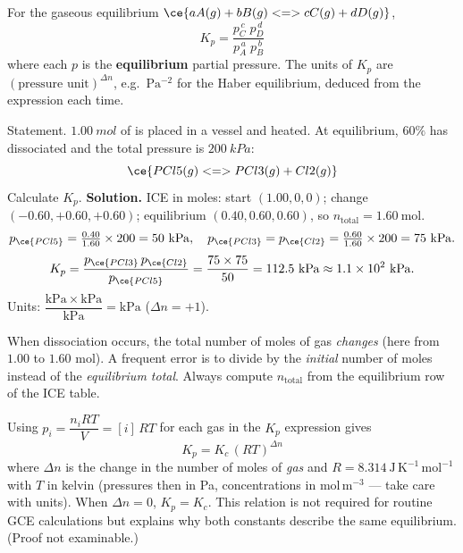 \documentclass[11pt]{article}
\begin{document}
\begin{definition}
For the gaseous equilibrium $\ce{aA(g) + bB(g) <=> cC(g) + dD(g)}$,
\[
K_p=\frac{p_C^{\,c}\; p_D^{\,d}}{p_A^{\,a}\; p_B^{\,b}}
\]
where each $p$ is the \textbf{equilibrium} partial pressure. The units of $K_p$ are $(\text{pressure unit})^{\Delta n}$, e.g.\ $\mathrm{Pa^{-2}}$ for the Haber equilibrium, deduced from the expression each time.
\end{definition}

\begin{exoresolu}
Statement. $\SI{1.00}{mol}$ of  is placed in a vessel and heated. At equilibrium, $60\%$ has dissociated and the total pressure is $\SI{200}{kPa}$:
\[
\ce{PCl5(g) <=> PCl3(g) + Cl2(g)}
\]
Calculate $K_p$.
\tcblower
\textbf{Solution.} ICE in moles: start $(1.00, 0, 0)$; change $(-0.60, +0.60, +0.60)$; equilibrium $(0.40, 0.60, 0.60)$, so $n_{\text{total}}=1.60\ \mathrm{mol}$.
\[
p_{\ce{PCl5}}=\tfrac{0.40}{1.60}\times200=50\ \mathrm{kPa},\quad
p_{\ce{PCl3}}=p_{\ce{Cl2}}=\tfrac{0.60}{1.60}\times200=75\ \mathrm{kPa}.
\]
\[
K_p=\frac{p_{\ce{PCl3}}\,p_{\ce{Cl2}}}{p_{\ce{PCl5}}}=\frac{75\times75}{50}=112.5\ \mathrm{kPa}\approx 1.1\times10^{2}\ \mathrm{kPa}.
\]
Units: $\dfrac{\mathrm{kPa}\times\mathrm{kPa}}{\mathrm{kPa}}=\mathrm{kPa}$ ($\Delta n = +1$).
\end{exoresolu}

\begin{attention}
When dissociation occurs, the total number of moles of gas \emph{changes} (here from $1.00$ to $1.60$ mol). A frequent error is to divide by the \emph{initial} number of moles instead of the \emph{equilibrium total}. Always compute $n_{\text{total}}$ from the equilibrium row of the ICE table.
\end{attention}

\begin{propriete}
Using $p_i = \dfrac{n_i RT}{V}=[i]\,RT$ for each gas in the $K_p$ expression gives
\[
K_p = K_c\,(RT)^{\Delta n}
\]
where $\Delta n$ is the change in the number of moles of \emph{gas} and $R=8.314\ \mathrm{J\,K^{-1}\,mol^{-1}}$ with $T$ in kelvin (pressures then in Pa, concentrations in $\mathrm{mol\,m^{-3}}$ --- take care with units). When $\Delta n = 0$, $K_p = K_c$. This relation is not required for routine GCE calculations but explains why both constants describe the same equilibrium. (Proof not examinable.)
\end{propriete}
\end{document}
